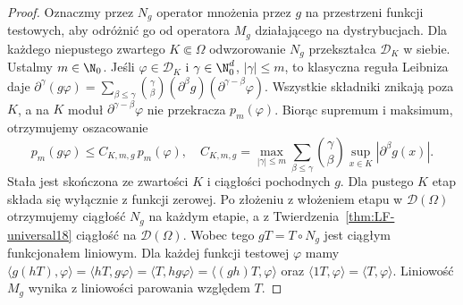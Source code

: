 \begin{proof}
Oznaczmy przez $N_g$ operator mnożenia przez $g$ na
przestrzeni funkcji testowych, aby odróżnić go od operatora
$M_g$ działającego na dystrybucjach.
Dla każdego niepustego zwartego $K\Subset\Omega$
odwzorowanie $N_g$ przekształca $\mathcal D_K$ w siebie.
Ustalmy $m\in\N_0$. Jeśli $\varphi\in\mathcal D_K$
i $\gamma\in\N_0^d$, $|\gamma|\le m$, to
klasyczna reguła Leibniza daje
$\partial^\gamma(g\varphi)=\sum_{\beta\le\gamma}
\binom\gamma\beta(\partial^\beta g)
(\partial^{\gamma-\beta}\varphi)$.
Wszystkie składniki znikają poza $K$, a na $K$ moduł
$\partial^{\gamma-\beta}\varphi$ nie przekracza $p_m(\varphi)$.
Biorąc supremum i maksimum, otrzymujemy oszacowanie
\[
 p_m(g\varphi)\le C_{K,m,g}\,p_m(\varphi),
 \quad C_{K,m,g}=\max_{|\gamma|\le m}
 \sum_{\beta\le\gamma}\binom\gamma\beta
 \sup_{x\in K}|\partial^\beta g(x)|.
\]
Stała jest skończona ze zwartości $K$ i ciągłości pochodnych $g$.
Dla pustego $K$ etap składa się wyłącznie z funkcji zerowej.
Po złożeniu z włożeniem etapu w $\mathcal D(\Omega)$
otrzymujemy ciągłość $N_g$ na każdym etapie, a z
Twierdzenia~\ref{thm:LF-universal18} ciągłość na $\mathcal D(\Omega)$.
Wobec tego $gT=T\circ N_g$ jest ciągłym funkcjonałem liniowym.
Dla każdej funkcji testowej $\varphi$ mamy
$\langle g(hT),\varphi\rangle=\langle hT,g\varphi\rangle
=\langle T,hg\varphi\rangle=\langle(gh)T,\varphi\rangle$
oraz $\langle1T,\varphi\rangle=\langle T,\varphi\rangle$.
Liniowość $M_g$ wynika z liniowości parowania względem $T$.


\end{proof}
